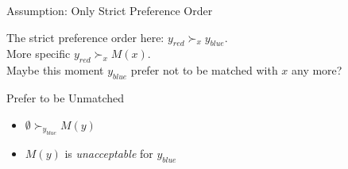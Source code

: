 \documentclass{beamer}
\begin{document}
\begin{frame}{Assumption: Only Strict Preference Order}
	\pause
	\begin{figure}
	\end{figure}
	\pause
	\begin{center}
		The strict preference order here: $y_{red} \succ_{x} y_{blue}$. \\ More specific $y_{red} \succ_{x} M(x)$.\\ 
		\pause
		Maybe this moment $y_{blue}$ prefer not to be matched with $x$ any more?
	\end{center}
\end{frame}



\begin{frame}{Prefer to be Unmatched}
	\begin{itemize}
		\item $\emptyset \succ_{y_{blue}} M(y)$ 
		\item $M(y)$ is \emph{unacceptable} for $y_{blue}$
	\end{itemize}
\end{frame}
\end{document}
